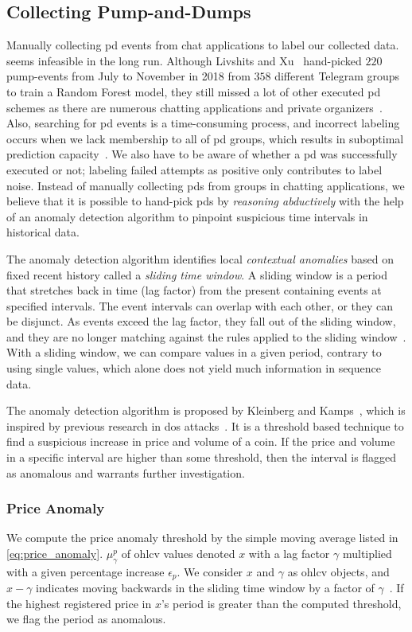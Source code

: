\subsection{Collecting Pump-and-Dumps}
Manually collecting \ac{pd} events from chat applications to label our collected data. seems infeasible in the long run. Although Livshits and Xu~\cite{P&D_anatomy} hand-picked $220$ pump-events from July to November in 2018 from $358$ different Telegram groups to train a Random Forest model, they still missed a lot of other executed \ac{pd} schemes as there are numerous chatting applications and private organizers~\cite{blockonomi}. Also, searching for \ac{pd} events is a time-consuming process, and incorrect labeling occurs when we lack membership to all of \ac{pd} groups, which results in suboptimal prediction capacity~\cite{label_noise}. We also have to be aware of whether a \ac{pd} was successfully executed or not; labeling failed attempts as positive only contributes to label noise. Instead of manually collecting \acp{pd} from groups in chatting applications, we believe that it is possible to hand-pick \acp{pd} by \emph{reasoning abductively} with the help of an anomaly detection algorithm to pinpoint suspicious time intervals in historical data.

The anomaly detection algorithm identifies local \emph{contextual anomalies} based on fixed recent history called a \emph{sliding time window}. A sliding window is a period that stretches back in time (lag factor) from the present containing events at specified intervals. The event intervals can overlap with each other, or they can be disjunct. As events exceed the lag factor, they fall out of the sliding window, and they are no longer matching against the rules applied to the sliding window~\cite{redhat}. With a sliding window, we can compare values in a given period, contrary to using single values, which alone does not yield much information in sequence data.

The anomaly detection algorithm is proposed by Kleinberg and Kamps~\cite{P&D_to_the_moon}, which is inspired by previous research in \ac{dos} attacks~\cite{dos}. It is a threshold based technique to find a suspicious increase in price and volume of a coin. If the price and volume in a specific interval are higher than some threshold, then the interval is flagged as anomalous and warrants further investigation.

\subsubsection{Price Anomaly}
We compute the price anomaly threshold by the simple moving average listed in \autoref{eq:price_anomaly}. $\mu_\gamma^p$ of \ac{ohlcv} values denoted $x$ with a lag factor $\gamma$ multiplied with a given percentage increase $\epsilon_p$. We consider $x$ and $\gamma$ as \ac{ohlcv} objects, and $x-\gamma$ indicates moving backwards in the sliding time window by a factor of $\gamma$~\cite{P&D_to_the_moon}. If the highest registered price in $x$'s period is greater than the computed threshold, we flag the period as anomalous.

